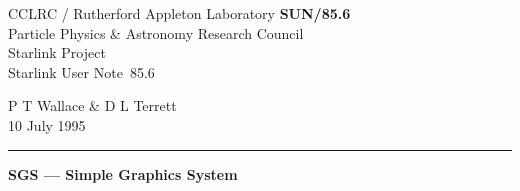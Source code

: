 \documentclass[11pt]{article}
\newcommand{\stardoccategory}  {Starlink User Note}
\newcommand{\stardocinitials}  {SUN}
\newcommand{\stardocnumber}    {85.6}
\newcommand{\stardocauthors}   {P T Wallace \& D L Terrett}
\newcommand{\stardocdate}      {10 July 1995}
\newcommand{\stardoctitle}     {SGS --- Simple Graphics System}
\newcommand{\stardocname}{\stardocinitials /\stardocnumber}
\newenvironment{latexonly}{}{}
\begin{document}
\thispagestyle{empty}

\begin{latexonly}
   CCLRC / {\sc Rutherford Appleton Laboratory} \hfill {\bf \stardocname}\\
   {\large Particle Physics \& Astronomy Research Council}\\
   {\large Starlink Project\\}
   {\large \stardoccategory\ \stardocnumber}
   \begin{flushright}
   \stardocauthors\\
   \stardocdate
   \end{flushright}
   \vspace{-4mm}
   \rule{\textwidth}{0.5mm}
   \vspace{5mm}
   \begin{center}
   {\Large\bf \stardoctitle}
   \end{center}
   \vspace{5mm}

\end{latexonly}
\end{document}
